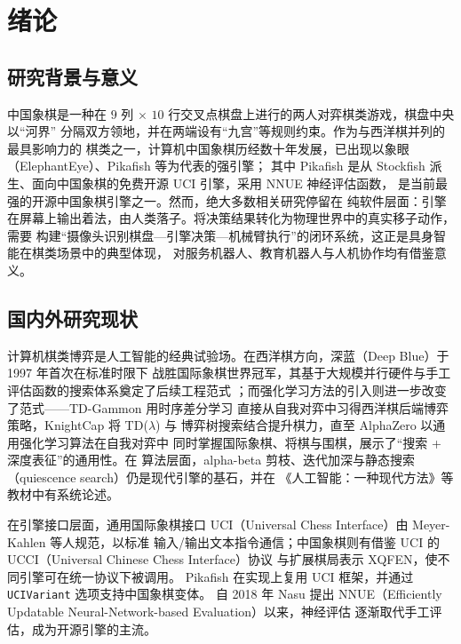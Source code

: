 \documentclass[UTF8, a4paper, 11pt, openany]{ctexbook}
\renewcommand{\_}{\textunderscore\allowbreak}
\begin{document}
\chapter{绪\quad 论}
\label{ch:intro}

\section{研究背景与意义}
中国象棋是一种在 $9$ 列 $\times$ $10$ 行交叉点棋盘上进行的两人对弈棋类游戏，棋盘中央以“河界”
分隔双方领地，并在两端设有“九宫”等规则约束\cite{xiangqi2024}。作为与西洋棋并列的最具影响力的
棋类之一，计算机中国象棋历经数十年发展，已出现以象眼（ElephantEye）、Pikafish 等为代表的强引擎；
其中 Pikafish 是从 Stockfish 派生、面向中国象棋的免费开源 UCI 引擎，采用 NNUE 神经评估函数，
是当前最强的开源中国象棋引擎之一\cite{pikafish2024,stockfish2024}。然而，绝大多数相关研究停留在
纯软件层面：引擎在屏幕上输出着法，由人类落子。将决策结果转化为物理世界中的真实移子动作，需要
构建“摄像头识别棋盘—引擎决策—机械臂执行”的闭环系统，这正是具身智能在棋类场景中的典型体现，
对服务机器人、教育机器人与人机协作均有借鉴意义。

\section{国内外研究现状}
\label{sec:related}
计算机棋类博弈是人工智能的经典试验场。在西洋棋方向，深蓝（Deep Blue）于 1997 年首次在标准时限下
战胜国际象棋世界冠军，其基于大规模并行硬件与手工评估函数的搜索体系奠定了后续工程范式
\cite{campbell2002deepblue}；而强化学习方法的引入则进一步改变了范式——TD-Gammon 用时序差分学习
直接从自我对弈中习得西洋棋后端博弈策略\cite{tesauro1995tdgammon}，KnightCap 将 TD($\lambda$) 与
博弈树搜索结合提升棋力\cite{baxter1998knightcap}，直至 AlphaZero 以通用强化学习算法在自我对弈中
同时掌握国际象棋、将棋与围棋，展示了“搜索 + 深度表征”的通用性\cite{silver2018mastering}。在
算法层面，alpha-beta 剪枝、迭代加深与静态搜索（quiescence search）仍是现代引擎的基石，并在
《人工智能：一种现代方法》等教材中有系统论述\cite{russell2020ai}。

在引擎接口层面，通用国际象棋接口 UCI（Universal Chess Interface）由 Meyer-Kahlen 等人规范，以标准
输入/输出文本指令通信\cite{uci2004}；中国象棋则有借鉴 UCI 的 UCCI（Universal Chinese Chess
Interface）协议\cite{ucci2007} 与扩展棋局表示 XQFEN\cite{xqfen2007}，使不同引擎可在统一协议下被调用。
Pikafish 在实现上复用 UCI 框架，并通过 \texttt{UCI\_Variant} 选项支持中国象棋变体\cite{pikafish2024}。
自 2018 年 Nasu 提出 NNUE（Efficiently Updatable Neural-Network-based Evaluation）以来，神经评估
逐渐取代手工评估，成为开源引擎的主流\cite{nasu2018nnue}。
\end{document}
